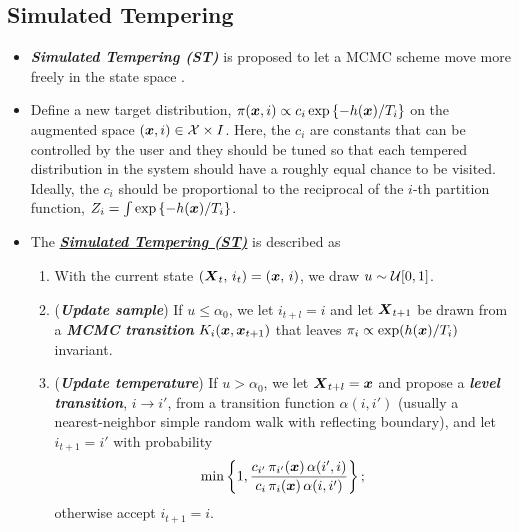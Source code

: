 \documentclass[11pt]{article}
\begin{document}
\subsection{Simulated Tempering}
\begin{itemize}
\item \emph{\textbf{Simulated Tempering (ST)}} is proposed to let a MCMC scheme move more freely in the state space \citep{liu2001monte}.

\item Define a new target distribution, $\pi(\boldsymbol{x}, i) \propto c_{i}\exp\left\{-h(\boldsymbol{x})/T_{i}\right\}$ on the augmented space $(\boldsymbol{x}, i) \in {\mathcal X} \times I$. Here, the $c_i$ are constants that can be controlled by the user and they should be tuned so that each tempered distribution in the system should have a roughly equal chance to be visited. Ideally, the $c_i$ should be proportional to the reciprocal of the $i$-th partition function, $Z_i = \int \exp\left\{-h(\boldsymbol{x})/T_i\right\}$.

\item The \underline{\emph{\textbf{Simulated Tempering (ST)}}} is described as 
\begin{enumerate}
\item With the current state $(\boldsymbol{X}_{t},\, i_{t}) = (\boldsymbol{x}, \,i)$, we draw $u\sim {\mathcal U}[0,1]$.
\item (\emph{\textbf{Update sample}}) If $u \le \alpha_0$, we let $i_{t+l} = i$ and let $\boldsymbol{X}_{t+1}$ be drawn from a \emph{\textbf{MCMC transition}} $K_i(\boldsymbol{x}, \boldsymbol{x}_{t+1})$ that leaves $\pi_i\propto \exp(h(\boldsymbol{x})/T_{i})$ invariant.

\item (\emph{\textbf{Update temperature}}) If $u > \alpha_0$, we let $\boldsymbol{X}_{t+l} = \boldsymbol{x}$ and propose a \emph{\textbf{level transition}}, $i \rightarrow i'$, from a transition function $\alpha(i, i')$ (usually a nearest-neighbor simple random walk with reflecting boundary), and let $i_{t+1} = i'$ with probability
\begin{align*}
\min\left\{1, \frac{c_{i'}\,\pi_{i'}(\boldsymbol{x})\,\alpha(i', i) }{ c_{i}\,\pi_i(\boldsymbol{x})\,\alpha(i, i')}\right\};
\end{align*} otherwise accept $i_{t+1} = i$.
\end{enumerate} 
\end{itemize}
\end{document}
